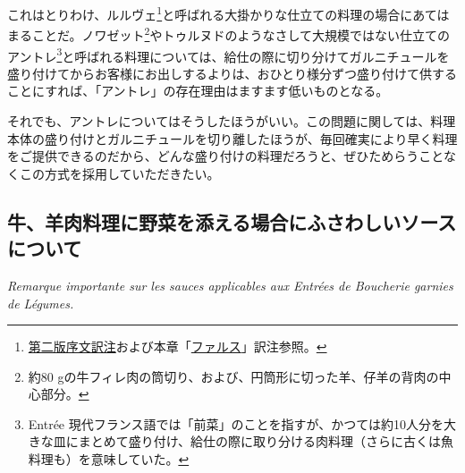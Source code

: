 \begin{main}
これはとりわけ、ルルヴェ\footnote{\protect\hyperlink{releve}{第二版序文訳注}および本章「\protect\hyperlink{farces}{ファルス}」訳注参照。}と呼ばれる大掛かりな仕立ての料理の場合にあてはまることだ。ノワゼット\footnote{約80
  gの牛フィレ肉の筒切り、および、円筒形に切った羊、仔羊の背肉の中心部分。}やトゥルヌドのようなさして大規模ではない仕立てのアントレ\footnote{Entrée
  現代フランス語では「前菜」のことを指すが、かつては約10人分を大きな皿にまとめて盛り付け、給仕の際に取り分ける肉料理（さらに古くは魚料理も）を意味していた。}と呼ばれる料理については、給仕の際に切り分けてガルニチュールを盛り付けてからお客様にお出しするよりは、おひとり様分ずつ盛り付けて供することにすれば、「アントレ」の存在理由はますます低いものとなる。

それでも、アントレについてはそうしたほうがいい。この問題に関しては、料理本体の盛り付けとガルニチュールを切り離したほうが、毎回確実により早く料理をご提供できるのだから、どんな盛り付けの料理だろうと、ぜひためらうことなくこの方式を採用していただきたい。

\hypertarget{remarque-importante-sur-les-sauces-applicables-aux-entrees-de-boucherie-garnies-de-legumes}{%
\subsection{牛、羊肉料理に野菜を添える場合にふさわしいソースについて}\label{remarque-importante-sur-les-sauces-applicables-aux-entrees-de-boucherie-garnies-de-legumes}}

\vspace{-1\zw}
\begin{center}
\textit{Remarque importante sur les sauces applicables aux Entrées de Boucherie garnies de Légumes.}
\end{center}


\end{main}
